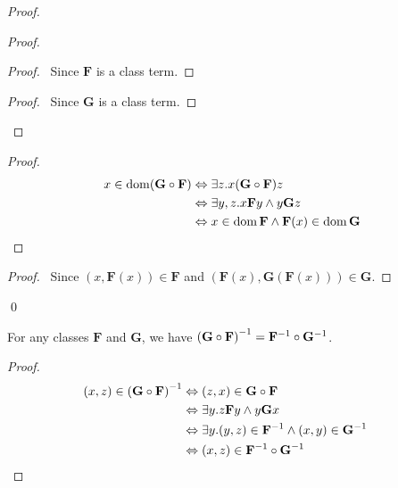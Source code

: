 \begin{proof}
    \pf
    \begin{proof}
        \begin{proof}
            \pf\ Since $\mathbf{F}$ is a class term.
        \end{proof}
        \begin{proof}
            \pf\ Since $\mathbf{G}$ is a class term.
        \end{proof}
    \end{proof}
    \begin{proof}
        \pf
        \begin{align*}
            x \in \operatorname{dom} (\mathbf{G} \circ \mathbf{F}) & \Leftrightarrow \exists z. x(\mathbf{G} \circ \mathbf{F})z \\
            & \Leftrightarrow \exists y, z. x\mathbf{F}y \wedge y\mathbf{G}z \\
            & \Leftrightarrow x \in \operatorname{dom} \mathbf{F} \wedge \mathbf{F}(x) \in \operatorname{dom} \mathbf{G}
        \end{align*}
    \end{proof}
    \begin{proof}
        \pf\ Since $(x,\mathbf{F}(x)) \in \mathbf{F}$ and $(\mathbf{F}(x),\mathbf{G}(\mathbf{F}(x))) \in \mathbf{G}$.
    \end{proof}
    \qed
\end{proof}

\begin{theorem}[Pairing]
    For any classes $\mathbf{F}$ and $\mathbf{G}$, we have
    ${(\mathbf{G} \circ \mathbf{F})}^{-1} = {\mathbf{F}}^{-1} \circ {\mathbf{G}}^{-1}$.
\end{theorem}

\begin{proof}
    \pf
    \begin{align*}
        (x,z) \in {(\mathbf{G} \circ \mathbf{F})}^{-1} & \Leftrightarrow (z,x) \in \mathbf{G} \circ \mathbf{F} \\
        & \Leftrightarrow \exists y. z\mathbf{F}y \wedge y\mathbf{G}x \\
        & \Leftrightarrow \exists y. (y,z) \in {\mathbf{F}}^{-1} \wedge (x,y) \in {\mathbf{G}}^{-1} \\
        & \Leftrightarrow (x,z) \in {\mathbf{F}}^{-1} \circ {\mathbf{G}}^{-1} & \relax
    \end{align*}
\end{proof}

